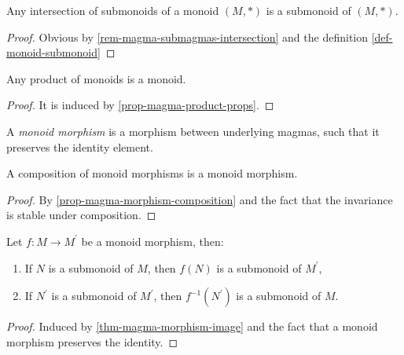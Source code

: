 \documentclass[12pt]{report}
\begin{document}
\begin{remark} \label{rem-monoid-submonoids-intersection}
    Any intersection of submonoids of a monoid $(M, \ast)$ is a submonoid of $(M, \ast)$.
\end{remark}

\begin{proof}
    Obvious by \ref{rem-magma-submagmas-intersection} and the definition \ref{def-monoid-submonoid}
\end{proof}

\begin{proposition} \label{prop-monoid-product}
    Any product of monoids is a monoid.
\end{proposition}

\begin{proof}
    It is induced by \ref{prop-magma-product-props}.
\end{proof}

\begin{definition} \label{def-monoid-morphism}
    A \emph{monoid morphism} is a morphism between underlying magmas, such that it preserves the identity element.
\end{definition}

\begin{proposition} \label{prop-monoid-morphism-composition}
    A composition of monoid morphisms is a monoid morphism.
\end{proposition}

\begin{proof}
    By \ref{prop-magma-morphism-composition} and the fact that the invariance is stable under composition.
\end{proof}

\begin{theorem} \label{thm-monoid-morphism-image}
    Let $f \colon M \to M^{\prime}$ be a monoid morphism, then:
    \begin{enumerate}[label=(\roman*)]
        \item If $N$ is a submonoid of $M$, then $f(N)$ is a submonoid of $M^{\prime}$,
        \item If $N^{\prime}$ is a submonoid of $M^{\prime}$, then $f^{-1}(N^{\prime})$ is a submonoid of $M$.
    \end{enumerate}
\end{theorem}

\begin{proof}
    Induced by \ref{thm-magma-morphism-image} and the fact that a monoid morphism preserves the identity.
\end{proof}
\end{document}
